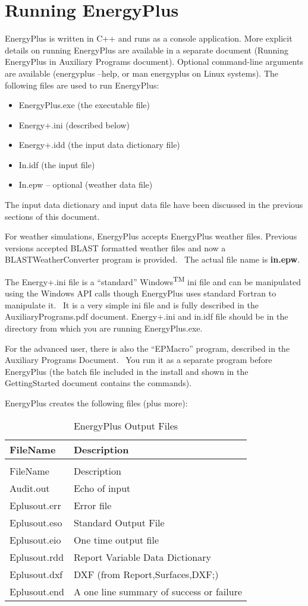 \chapter{Running EnergyPlus}\label{running-energyplus}

EnergyPlus is written in C++ and runs as a console application. More explicit details on running EnergyPlus are available in a separate document (Running EnergyPlus in Auxiliary Programs document). Optional command-line arguments are available (energyplus --help, or man energyplus on Linux systems). The following files are used to run EnergyPlus:

\begin{itemize}
\item
  EnergyPlus.exe (the executable file)
\item
  Energy+.ini (described below)
\item
  Energy+.idd (the input data dictionary file)
\item
  In.idf (the input file)
\item
  In.epw -- optional (weather data file)
\end{itemize}

The input data dictionary and input data file have been discussed in the previous sections of this document.

For weather simulations, EnergyPlus accepts EnergyPlus weather files. Previous versions accepted BLAST formatted weather files and now a BLASTWeatherConverter program is provided.~ The actual file name is \textbf{in.epw}.

The Energy+.ini file is a ``standard'' Windows\textsuperscript{TM} ini file and can be manipulated using the Windows API calls though EnergyPlus uses standard Fortran to manipulate it.~ It is a very simple ini file and is fully described in the AuxiliaryPrograms.pdf document. Energy+.ini and in.idf file should be in the directory from which you are running EnergyPlus.exe.

For the advanced user, there is also the ``EPMacro'' program, described in the Auxiliary Programs Document.~ You run it as a separate program before EnergyPlus (the batch file included in the install and shown in the GettingStarted document contains the commands).

EnergyPlus creates the following files (plus more):

\begin{longtable}[c]{@{}ll@{}}
\caption{EnergyPlus Output Files \label{table:energyplus-output-files}} \tabularnewline
\toprule 
FileName & Description \tabularnewline
\midrule
\endfirsthead

\caption[]{EnergyPlus Output Files} \tabularnewline
\toprule 
FileName & Description \tabularnewline
\midrule
\endhead

Audit.out & Echo of input \tabularnewline
Eplusout.err & Error file \tabularnewline
Eplusout.eso & Standard Output File \tabularnewline
Eplusout.eio & One time output file \tabularnewline
Eplusout.rdd & Report Variable Data Dictionary \tabularnewline
Eplusout.dxf & DXF (from Report,Surfaces,DXF;) \tabularnewline
Eplusout.end & A one line summary of success or failure \tabularnewline
\bottomrule
\end{longtable}

